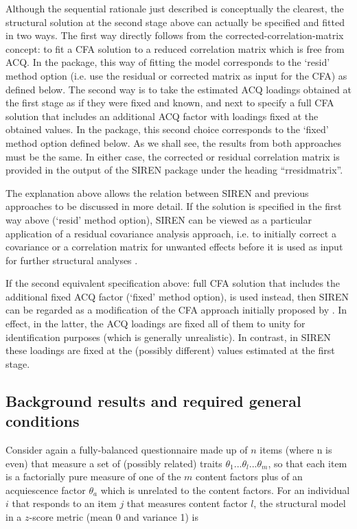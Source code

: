 Although the sequential rationale just described is conceptually the clearest, the structural solution at the second stage above can actually be specified and fitted in two ways. The first way directly follows from the corrected-correlation-matrix concept: to fit a CFA solution to a reduced correlation matrix which is free from ACQ. In the  package, this way of fitting the model corresponds to the ‘resid’ method option (i.e. use the residual or corrected matrix as input for the CFA) as defined below. The second way is to take the estimated ACQ loadings obtained at the first stage as if they were fixed and known, and next to specify a full CFA solution that includes an additional ACQ factor with loadings fixed at the obtained values. In the  package, this second choice corresponds to the ‘fixed’ method option defined below.  As we shall see, the results from both approaches must be the same. In either case, the corrected or residual correlation matrix is provided in the output of the SIREN package under the heading “rresidmatrix”.

The explanation above allows the relation between SIREN and previous approaches to be discussed in more detail. If the solution is specified in the first way above (‘resid’ method option), SIREN can be viewed as a particular application of a residual covariance analysis approach, i.e. to initially correct a covariance or a correlation matrix for unwanted effects before it is used as input for further structural analyses \citep[e.g.][] {Andrews:1984, Asparouhov:2023, DeCastellarnau:2021, tenBerge:1999}.

If the second equivalent specification above: full CFA solution that includes the additional fixed ACQ factor (‘fixed’ method option), is used instead, then SIREN can be regarded as a modification of the CFA approach initially proposed by \citet{Billiet:2000}. In effect, in the latter, the ACQ loadings are fixed all of them to unity for identification purposes (which is generally unrealistic). In contrast, in SIREN these loadings are fixed at the (possibly different) values estimated at the first stage.

\subsection{Background results and required general conditions}

Consider again a fully-balanced questionnaire made up of $n$ items (where n is even) that measure a set of (possibly related) traits $\theta_1...\theta_l...\theta_m$, so that each item is a factorially pure measure of one of the $m$ content factors plus of an acquiescence factor $\theta_a$ which is unrelated to the content factors. For an individual $i$ that responds to an item $j$ that measures content factor $l$, the structural model in a $z$-score metric (mean 0 and variance 1) is

